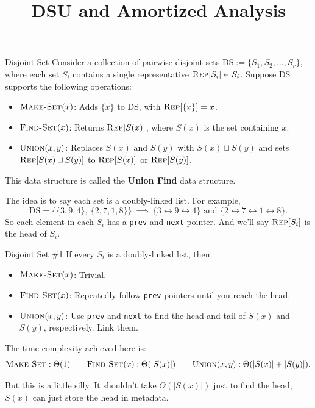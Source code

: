 \title{DSU and Amortized Analysis}



\begin{problem}{Disjoint Set}
    Consider a collection of pairwise disjoint sets $\text{DS} := \{ S_1, S_2, \dots, S_r\}$, where each set $S_i$ contains a single representative $\textsc{Rep}[S_i] \in S_i$.  Suppose $\text{DS}$ supports the following operations:
    \begin{itemize}
        \item $\textsc{Make-Set}(x)$: Adds $\{x\}$ to $\text{DS}$, with $\textsc{Rep}[\{x\}] = x$.
        \item $\textsc{Find-Set}(x)$: Returns $\textsc{Rep}[S(x)]$, where $S(x)$ is the set containing $x$.
        \item $\textsc{Union}(x, y)$: Replaces $S(x)$ and $S(y)$ with $S(x) \sqcup S(y)$ and sets $\textsc{Rep}[S(x) \sqcup S(y)]$ to $\textsc{Rep}[S(x)]$ or $\textsc{Rep}[S(y)]$.
    \end{itemize}
    This data structure is called the \textbf{Union Find} data structure.
\end{problem}

The idea is to say each set is a doubly-linked list.  For example,
\[ \text{DS} = \{ \{3, 9, 4\}, \ \{2, 7, 1, 8\} \} ~ \implies ~ \{ 3 \leftrightarrow 9 \leftrightarrow 4 \} \text{ and } \{ 2 \leftrightarrow 7 \leftrightarrow 1 \leftrightarrow 8 \}. \]
So each element in each $S_i$ has a \texttt{prev} and \texttt{next} pointer.  And we'll say $\textsc{Rep}[S_i]$ is the head of $S_i$.

\begin{solution*}{Disjoint Set \#1}
    If every $S_i$ is a doubly-linked list, then:
    \begin{itemize}
        \item $\textsc{Make-Set}(x)$: Trivial.
        \item $\textsc{Find-Set}(x)$: Repeatedly follow \texttt{prev} pointers until you reach the head.
        \item $\textsc{Union}(x, y)$: Use \texttt{prev} and \texttt{next} to find the head and tail of $S(x)$ and $S(y)$, respectively.  Link them.
    \end{itemize}
    The time complexity achieved here is:
    \[ \textsc{Make-Set}: \Theta(1) ~~~~~~ \textsc{Find-Set}(x): \Theta(|S(x)|) ~~~~~~ \textsc{Union}(x, y): \Theta(|S(x)| + |S(y)|). \]
\end{solution*}

But this is a little silly.  It shouldn't take $\Theta(|S(x)|)$ just to find the head; $S(x)$ can just store the head in metadata.

